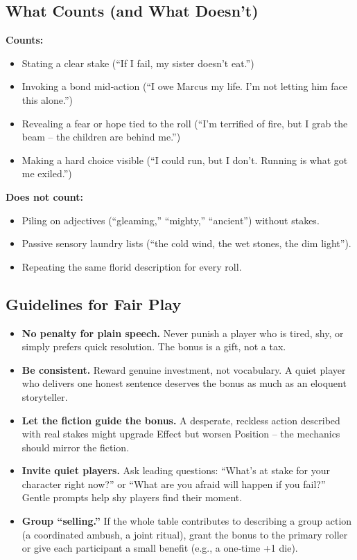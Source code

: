 \begin{tcolorbox}
\subsection*{What Counts (and What Doesn’t)}
\textbf{Counts:}
\begin{itemize}
  \item Stating a clear stake (“If I fail, my sister doesn’t eat.”)
  \item Invoking a bond mid‑action (“I owe Marcus my life. I’m not letting him face this alone.”)
  \item Revealing a fear or hope tied to the roll (“I’m terrified of fire, but I grab the beam – the children are behind me.”)
  \item Making a hard choice visible (“I could run, but I don’t. Running is what got me exiled.”)
\end{itemize}
\textbf{Does not count:}
\begin{itemize}
  \item Piling on adjectives (“gleaming,” “mighty,” “ancient”) without stakes.
  \item Passive sensory laundry lists (“the cold wind, the wet stones, the dim light”).
  \item Repeating the same florid description for every roll.
\end{itemize}

\subsection*{Guidelines for Fair Play}
\begin{itemize}
  \item \textbf{No penalty for plain speech.} Never punish a player who is tired,
        shy, or simply prefers quick resolution. The bonus is a gift, not a tax.
  \item \textbf{Be consistent.} Reward genuine investment, not vocabulary. A
        quiet player who delivers one honest sentence deserves the bonus as much
        as an eloquent storyteller.
  \item \textbf{Let the fiction guide the bonus.} A desperate, reckless action
        described with real stakes might upgrade Effect but worsen Position –
        the mechanics should mirror the fiction.
  \item \textbf{Invite quiet players.} Ask leading questions: “What’s at stake
        for your character right now?” or “What are you afraid will happen if
        you fail?” Gentle prompts help shy players find their moment.
  \item \textbf{Group “selling.”} If the whole table contributes to describing a
        group action (a coordinated ambush, a joint ritual), grant the bonus to
        the primary roller or give each participant a small benefit (e.g., a
        one‑time +1 die).
\end{itemize}


\end{tcolorbox}
